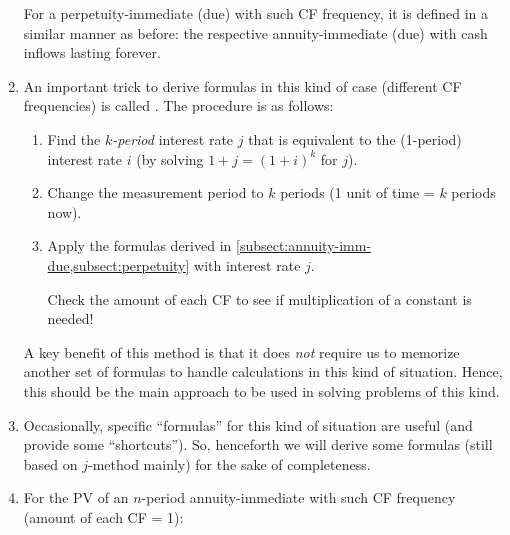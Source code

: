\begin{enumerate}
\begin{note}
For a perpetuity-immediate (due) with such CF frequency, it is defined in a
similar manner as before: the respective annuity-immediate (due) with cash
inflows lasting forever.
\end{note}
\item An important trick to derive formulas in this kind of case (different CF
frequencies) is called . The procedure is as follows:
\begin{enumerate}
\item Find the \emph{\(k\)-period} interest rate \(j\) that is equivalent to the
(1-period) interest rate \(i\) (by solving \(1+j=(1+i)^k\) for \(j\)).
\item Change the measurement period to \(k\) periods (1 unit of time = \(k\)
periods now).
\item Apply the formulas derived in
\cref{subsect:annuity-imm-due,subsect:perpetuity} with interest rate \(j\).
\begin{warning}
Check the amount of each CF to see if multiplication of a constant is needed!
\end{warning}
\end{enumerate}
A key benefit of this method is that it does \emph{not} require us to memorize
another set of formulas to handle calculations in this kind of situation.
Hence, this should be the main approach to be used in solving problems of this
kind.
\item Occasionally, specific ``formulas'' for this kind of situation are useful
(and provide some ``shortcuts''). So, henceforth we will derive some formulas
(still based on \(j\)-method mainly) for the sake of completeness.
\item \label{it:pv-annuity-imm-less-freq}
For the PV of an \(n\)-period annuity-immediate with such CF frequency (amount of each CF = 1):
\begin{center}
\end{center}
\end{enumerate}

